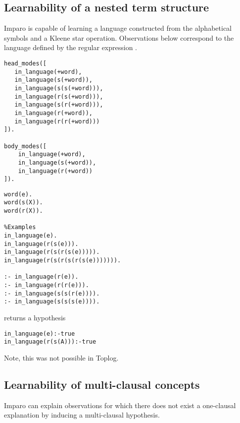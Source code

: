\subsection{Learnability of a nested term structure}\label{imparo_learnability_of_nested_term_structure}
Imparo is capable of learning a language constructed from the alphabetical symbols and a Kleene star operation. Observations below correspond to the language defined by the regular expression .

\begin{minipage}[t]{.50\textwidth}
\begin{lstlisting}
head_modes([
   in_language(+word),
   in_language(s(+word)),  
   in_language(s(s(+word))),
   in_language(r(s(+word))),
   in_language(s(r(+word))),
   in_language(r(+word)),
   in_language(r(r(+word)))
]).

body_modes([
    in_language(+word),
    in_language(s(+word)),
    in_language(r(+word))
]).
\end{lstlisting}
\end{minipage}
\begin{minipage}[t]{.40\textwidth}
\begin{lstlisting}
word(e).
word(s(X)).
word(r(X)).

%Examples
in_language(e).
in_language(r(s(e))).
in_language(r(s(r(s(e))))).
in_language(r(s(r(s(r(s(e))))))).

:- in_language(r(e)).
:- in_language(r(r(e))).
:- in_language(s(s(r(e)))).
:- in_language(s(s(s(e)))).
\end{lstlisting}
\end{minipage}


returns a hypothesis
\begin{lstlisting}
in_language(e):-true
in_language(r(s(A))):-true
\end{lstlisting}

Note, this was not possible in Toplog.

\subsection{Learnability of multi-clausal concepts}
Imparo can explain observations for which there does not exist a one-clausal explanation by inducing a multi-clausal hypothesis.

